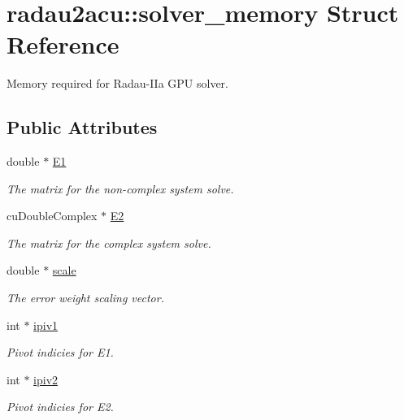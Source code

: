 \hypertarget{structradau2acu_1_1solver__memory}{}\section{radau2acu\+:\+:solver\+\_\+memory Struct Reference}
\label{structradau2acu_1_1solver__memory}


Memory required for Radau-\/\+I\+Ia G\+PU solver.  


\subsection*{Public Attributes}
\begin{DoxyCompactItemize}
\item 
double $\ast$ \hyperlink{structradau2acu_1_1solver__memory_aeb9205a7ae71b2356f6e65a65674f210}{E1}
\begin{DoxyCompactList}\small\item\em The matrix for the non-\/complex system solve. \end{DoxyCompactList}\item 
cu\+Double\+Complex $\ast$ \hyperlink{structradau2acu_1_1solver__memory_a5dd9142fe612186ef7beaaa127d6d833}{E2}
\begin{DoxyCompactList}\small\item\em The matrix for the complex system solve. \end{DoxyCompactList}\item 
double $\ast$ \hyperlink{structradau2acu_1_1solver__memory_a926e0233a4ea4622cd5114d00b0742ae}{scale}
\begin{DoxyCompactList}\small\item\em The error weight scaling vector. \end{DoxyCompactList}\item 
int $\ast$ \hyperlink{structradau2acu_1_1solver__memory_a308d883e7aadcfff57771ea20135d5de}{ipiv1}
\begin{DoxyCompactList}\small\item\em Pivot indicies for E1. \end{DoxyCompactList}\item 
int $\ast$ \hyperlink{structradau2acu_1_1solver__memory_acea874961a50a0ea2fe6faf2a525f9bc}{ipiv2}
\begin{DoxyCompactList}\small\item\em Pivot indicies for E2. \end{DoxyCompactList}\item 

\end{DoxyCompactItemize}
